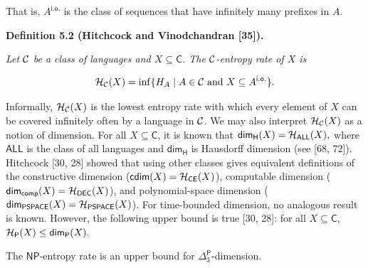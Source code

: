 \documentclass[10pt,a4paper]{article}
\begin{document}
That is, $A^{\mathsf{i.o.}}$ is the class of sequences that have infinitely many
prefixes in $A$.\par





\par\medskip\noindent\textbf{
\textbf{Definition 5.2}\textbf{ }(Hitchcock and Vinodchandran [35])\textbf{.}
}\par



\emph{Let ${\cal C}$ be a class of languages and $X\subseteq\mathsf{C}$. The ${\cal C}$-entropy rate of $X$ is}\par


\[\begin{gathered}
{\cal H}_{\cal C}(X)=\inf\{H_{A}\mid A\in{\cal C}\textrm{ and }X\subseteq A^{\mathsf{i.o.}}\}.
\end{gathered}\]






Informally, ${\cal H}_{\cal C}(X)$ is the lowest entropy rate with which every
element of $X$ can be covered infinitely often by a language in
${\cal C}$.
We may also interpret ${\cal H}_{\cal C}(X)$ as a notion of dimension.
For all $X\subseteq\mathsf{C}$, it is known that
${\mathsf{dim}}_{\mathsf{H}}(X)={\cal H}_{\mathsf{ALL}}(X),$ where $\mathsf{ALL}$ is the class of all
languages and ${\mathsf{dim}}_{\mathsf{H}}$ is Hausdorff dimension (see [68, 72]). Hitchcock [30, 28] showed that using other
classes gives equivalent definitions of the constructive dimension ($\mathsf{cdim}(X)={\cal H}_{\mathsf{CE}}(X)$), computable dimension (${\mathsf{dim}}_{\mathsf{comp}}(X)={\cal H}_{\mathsf{DEC}}(X)$), and polynomial-space dimension (${\mathsf{dim}}_{\mathsf{PSPACE}}(X)={\cal H}_{\mathsf{PSPACE}}(X)$).
For time-bounded dimension, no analogous result is known.
However, the following upper bound is true [30, 28]:
for all $X\subseteq\mathsf{C}$, ${\cal H}_{\mathsf{P}}(X)\leq{\mathsf{dim}}_{\mathsf{P}}(X).$\par




The $\mathsf{NP}$-entropy rate is an upper bound for
${\Delta^{\mathsf{P}}_{3}}$-dimension.\par



\end{document}
